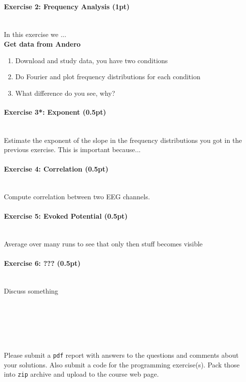 \documentclass[a4paper,11pt]{article}
\newenvironment{exercise}[3]{\paragraph{Exercise #1: #2 (#3pt)}\ \\}{
\medskip}
\begin{document}
\begin{exercise}{2}{Frequency Analysis}{1}
In this exercise we ... \\
\textbf{Get data from Andero}
\begin{enumerate}
\itemsep 0em
	\item Download and study data, you have two conditions
	\item Do Fourier and plot frequency distributions for each condition
	\item What difference do you see, why?
\end{enumerate}
\end{exercise}

\begin{exercise}{3*}{Exponent}{0.5}
Estimate the exponent of the slope in the frequency distributions you got in the previous exercise. This is important because...
\end{exercise}

\begin{exercise}{4}{Correlation}{0.5}
Compute correlation between two EEG channels.
\end{exercise}

\begin{exercise}{5}{Evoked Potential}{0.5}
Average over many runs to see that only then stuff becomes visible
\end{exercise}


\begin{exercise}{6}{???}{0.5}
Discuss something
\end{exercise}
\ \\
\ \\
\ \\
\ \\
\ \\
Please submit a \texttt{pdf} report with answers to the questions and comments about your solutions. Also submit a code for the programming exercise(s). Pack those into \texttt{zip} archive and upload to the course web page.
\end{document}
